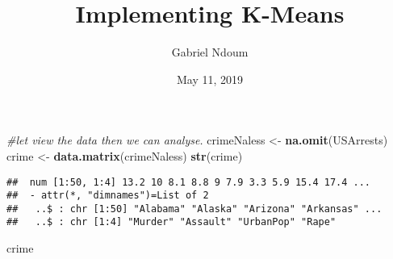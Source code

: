 \documentclass[]{article}
\title{Implementing K-Means}
\author{Gabriel Ndoum}
\date{May 11, 2019}
\newenvironment{Shaded}{\begin{snugshade}}{\end{snugshade}}
\newcommand{\KeywordTok}[1]{\textcolor[rgb]{0.13,0.29,0.53}{\textbf{#1}}}
\newcommand{\StringTok}[1]{\textcolor[rgb]{0.31,0.60,0.02}{#1}}
\newcommand{\CommentTok}[1]{\textcolor[rgb]{0.56,0.35,0.01}{\textit{#1}}}
\newcommand{\NormalTok}[1]{#1}
\begin{document}
\maketitle

\begin{Shaded}
\begin{Highlighting}[]
\CommentTok{#let view the data then we can analyse.}
\NormalTok{crimeNaless <-}\StringTok{ }\KeywordTok{na.omit}\NormalTok{(USArrests)}
\NormalTok{crime <-}\StringTok{ }\KeywordTok{data.matrix}\NormalTok{(crimeNaless)}
\KeywordTok{str}\NormalTok{(crime)}
\end{Highlighting}
\end{Shaded}

\begin{verbatim}
##  num [1:50, 1:4] 13.2 10 8.1 8.8 9 7.9 3.3 5.9 15.4 17.4 ...
##  - attr(*, "dimnames")=List of 2
##   ..$ : chr [1:50] "Alabama" "Alaska" "Arizona" "Arkansas" ...
##   ..$ : chr [1:4] "Murder" "Assault" "UrbanPop" "Rape"
\end{verbatim}

\begin{Shaded}
\begin{Highlighting}[]
\NormalTok{crime}
\end{Highlighting}
\end{Shaded}
\end{document}
